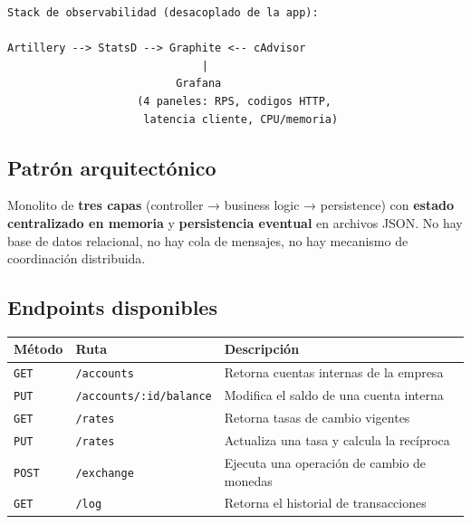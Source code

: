 \begin{verbatim}
Stack de observabilidad (desacoplado de la app):

Artillery --> StatsD --> Graphite <-- cAdvisor
                              |
                          Grafana
                    (4 paneles: RPS, codigos HTTP,
                     latencia cliente, CPU/memoria)
\end{verbatim}

\subsection{Patrón arquitectónico}

Monolito de \textbf{tres capas} (controller → business logic → persistence) con \textbf{estado centralizado en memoria} y \textbf{persistencia eventual} en archivos JSON. No hay base de datos relacional, no hay cola de mensajes, no hay mecanismo de coordinación distribuida.

\subsection{Endpoints disponibles}

\begin{table}[h!]
\centering
\begin{tabular}{lll}
\toprule
\textbf{Método} & \textbf{Ruta} & \textbf{Descripción} \\
\midrule
\texttt{GET} & \texttt{/accounts} & Retorna cuentas internas de la empresa \\
\texttt{PUT} & \texttt{/accounts/:id/balance} & Modifica el saldo de una cuenta interna \\
\texttt{GET} & \texttt{/rates} & Retorna tasas de cambio vigentes \\
\texttt{PUT} & \texttt{/rates} & Actualiza una tasa y calcula la recíproca \\
\texttt{POST} & \texttt{/exchange} & Ejecuta una operación de cambio de monedas \\
\texttt{GET} & \texttt{/log} & Retorna el historial de transacciones \\
\bottomrule
\end{tabular}
\end{table}